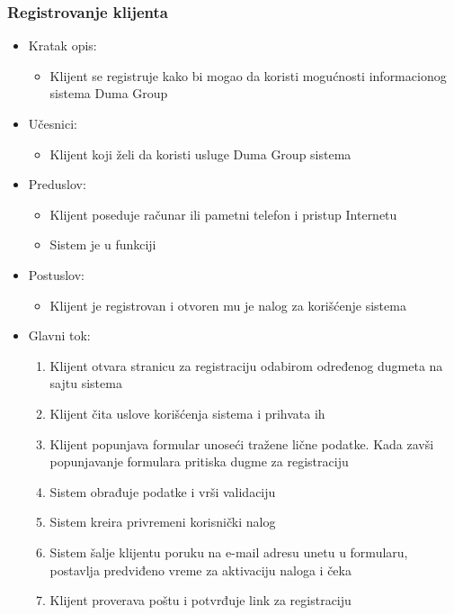 \documentclass[a4paper]{article}
\begin{document}
\subsubsection{Registrovanje klijenta}

\begin{itemize}
    \item Kratak opis:
        \begin{itemize}
            \item Klijent se registruje kako bi mogao da koristi mogućnosti informacionog sistema Duma Group
        \end{itemize}
    \item Učesnici:
        \begin{itemize}
            \item Klijent koji želi da koristi usluge Duma Group sistema
        \end{itemize}
    \item Preduslov:
        \begin{itemize}
            \item Klijent poseduje računar ili pametni telefon i pristup Internetu
            \item Sistem je u funkciji
        \end{itemize}
    \item Postuslov:
        \begin{itemize}
            \item Klijent je registrovan i otvoren mu je nalog za korišćenje sistema
        \end{itemize}
    \item Glavni tok:
        \begin{enumerate}
            \item  Klijent otvara stranicu za registraciju odabirom određenog dugmeta na sajtu sistema
            \item Klijent čita uslove korišćenja sistema i prihvata ih
            \item Klijent popunjava formular unoseći tražene lične podatke. Kada zavši popunjavanje formulara pritiska dugme za registraciju
            \item Sistem obrađuje podatke i vrši validaciju
            \item Sistem kreira privremeni korisnički nalog
            \item Sistem šalje klijentu poruku na e-mail adresu unetu u formularu, postavlja predviđeno vreme za aktivaciju naloga i čeka
            \item Klijent proverava poštu i potvrđuje link za registraciju

\end{enumerate}
\end{itemize}
\end{document}
